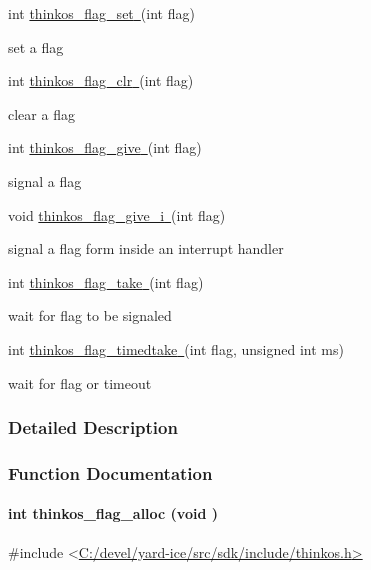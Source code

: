 {{int
}{\protect\hyperlink{h.46r0co2}{thinkos\_flag\_set}}{\protect\hyperlink{h.46r0co2}{~}}{(int
flag)}

{set a flag }

{int
}{\protect\hyperlink{h.2lwamvv}{thinkos\_flag\_clr}}{\protect\hyperlink{h.2lwamvv}{~}}{(int
flag)}

{clear a flag }

{int
}{\protect\hyperlink{h.111kx3o}{thinkos\_flag\_give}}{\protect\hyperlink{h.111kx3o}{~}}{(int
flag)}

{signal a flag }

{void
}{\protect\hyperlink{h.3l18frh}{thinkos\_flag\_give\_i}}{\protect\hyperlink{h.3l18frh}{~}}{(int
flag)}

{signal a flag form inside an interrupt handler }

{int
}{\protect\hyperlink{h.206ipza}{thinkos\_flag\_take}}{\protect\hyperlink{h.206ipza}{~}}{(int
flag)}

{wait for flag to be signaled }

{int
}{\protect\hyperlink{h.4k668n3}{thinkos\_flag\_timedtake}}{\protect\hyperlink{h.4k668n3}{~}}{(int
flag, unsigned int ms)}

{wait for flag or timeout }

{}

\subsubsection{\texorpdfstring{{Detailed
Description}}{Detailed Description}}\label{detailed-description-6}

{}

{}

\subsubsection{\texorpdfstring{{Function
Documentation}}{Function Documentation}}\label{function-documentation-6}

\paragraph{\texorpdfstring{{int thinkos\_flag\_alloc (void
)}}{int thinkos\_flag\_alloc (void )}}\label{int-thinkos_flag_alloc-void}

{}

{\#include
\textless{}}{\protect\hyperlink{h.pkwqa1}{C:/devel/yard-ice/src/sdk/include/thinkos.h}}{\protect\hyperlink{h.pkwqa1}{\textgreater{}}}

}
